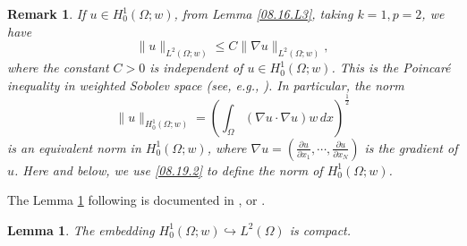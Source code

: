 \documentclass[11pt]{article}
\newtheorem{remark}{Remark}[section]
\newtheorem{lemma}{Lemma}[section]
\numberwithin{equation}{section}
\begin{document}
\begin{remark}\label{08.16.R1}
If $u \in H_0^1(\Omega; w)$, from Lemma \ref{08.16.L3}, taking $k = 1, p = 2$, we have
\begin{equation}\label{08.16.8}
\|u\|_{L^2(\Omega; w)} \leq C\|\nabla u\|_{L^2(\Omega; w)},
\end{equation}
where the constant $C > 0$ is independent of $u \in H_0^1(\Omega; w)$. This is the Poincar\'{e} inequality in weighted Sobolev space (see, e.g., \cite[chapter 1 in]{Heinonen}).
In particular, the norm
\begin{equation}\label{08.19.2}
\|u\|_{H_0^1(\Omega; w)} = \left(\int_\Omega (\nabla u \cdot \nabla u)w \, dx\right)^{\frac{1}{2}}
\end{equation}
is an equivalent norm in $H_0^1(\Omega; w)$, where $\nabla u = \left(\frac{\partial u}{\partial x_1}, \cdots, \frac{\partial u}{\partial x_N}\right)$ is the gradient of $u$. Here and below, we use \eqref{08.19.2} to define the norm of $H_0^1(\Omega; w)$.
\end{remark}


The Lemma \ref{08.15.L4} following is documented  in \cite[theorem 3.4]{Wu}, or   \cite[proposition 2.1 (5)]{Stuart}.
\begin{lemma}\label{08.15.L4}
The embedding $H_0^1(\Omega; w) \hookrightarrow L^2(\Omega)$ is compact.
\end{lemma}
\end{document}
